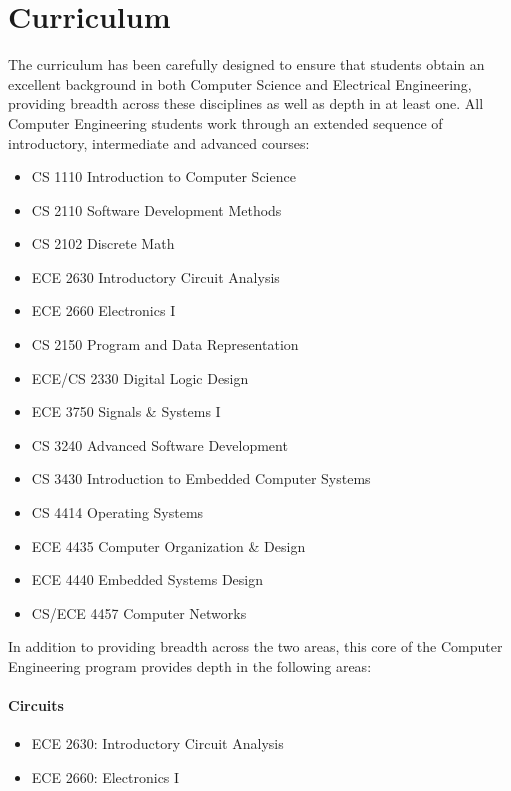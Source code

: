 \documentclass[10pt,letter]{book}
\newenvironment{itemlist}{
\begin{itemize}
\setlength{\itemsep}{0pt}
\setlength{\parskip}{0pt}}
{\end{itemize}}
\newcommand{\mysection}[1]{\section{#1}\renewcommand{\rightmark}{#1}}
\begin{document}
\mysection{Curriculum} %

The curriculum has been carefully designed to ensure that students
obtain an excellent background in both Computer Science and Electrical
Engineering, providing breadth across these disciplines as well as
depth in at least one. All Computer Engineering students work through
an extended sequence of introductory, intermediate and advanced
courses:

\begin{itemlist}
\item CS 1110 Introduction to Computer Science
\item CS 2110 Software Development Methods
\item CS 2102 Discrete Math
\item ECE 2630 Introductory Circuit Analysis
\item ECE 2660 Electronics I
\item CS 2150 Program and Data Representation
\item ECE/CS 2330 Digital Logic Design
\item ECE 3750 Signals \& Systems I
\item CS 3240 Advanced Software Development
\item CS 3430 Introduction to Embedded Computer Systems
\item CS 4414 Operating Systems
\item ECE 4435 Computer Organization \& Design
\item ECE 4440 Embedded Systems Design
\item CS/ECE 4457 Computer Networks
\end{itemlist}


In addition to providing breadth across the two areas,
this core of the Computer Engineering program provides
depth in the following areas:

\paragraph{Circuits}
\begin{itemlist}
\item ECE 2630: Introductory Circuit Analysis
\item ECE 2660: Electronics I
\end{itemlist}
\end{document}
